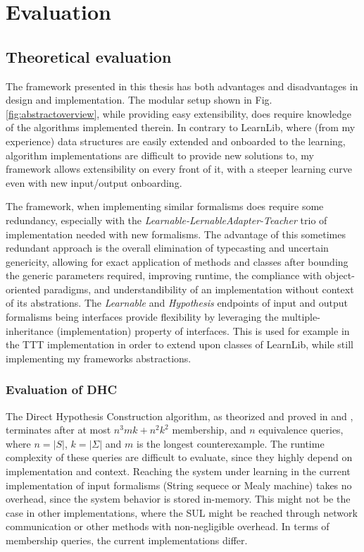 \chapter{Evaluation}

\section{Theoretical evaluation}

The framework presented in this thesis has both advantages and disadvantages in design and implementation. The modular setup shown in Fig. \ref{fig:abstractoverview}, while providing easy extensibility, does require knowledge of the algorithms implemented therein. In contrary to LearnLib, where (from my experience) data structures are easily extended and onboarded to the learning, algorithm implementations are difficult to provide new solutions to, my framework allows extensibility on every front of it, with a steeper learning curve even with new input/output onboarding.

The framework, when implementing similar formalisms does require some redundancy, especially with the \emph{Learnable-LernableAdapter-Teacher} trio of implementation needed with new formalisms. The advantage of this sometimes redundant approach is the overall elimination of typecasting and uncertain genericity, allowing for exact application of methods and classes after bounding the generic parameters required, improving runtime, the compliance with object-oriented paradigms, and understandibility of an implementation without context of its abstrations. The \emph{Learnable} and \emph{Hypothesis} endpoints of input and output formalisms being interfaces provide flexibility by leveraging the multiple-inheritance (implementation) property of interfaces. This is used for example in the TTT implementation in order to extend upon classes of LearnLib, while still implementing my frameworks abstractions.

\subsection{Evaluation of DHC}

The Direct Hypothesis Construction algorithm, as theorized and proved in \cite{Steffen2011} and \cite{10.1007/978-3-642-34781-8_19}, terminates after at most $n^3mk+n^2k^2$ membership, and $n$ equivalence queries, where $n=|S|$, $k=|\Sigma|$ and $m$ is the longest counterexample. The runtime complexity of these queries are difficult to evaluate, since they highly depend on implementation and context. Reaching the system under learning in the current implementation of input formalisms (String sequece or Mealy machine) takes no overhead, since the system behavior is stored in-memory. This might not be the case in other implementations, where the SUL might be reached through network communication or other methods with non-negligible overhead. In terms of membership queries, the current implementations differ. 

